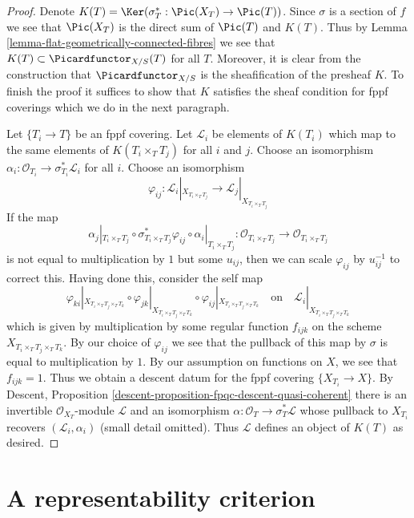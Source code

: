 \begin{proof}
Denote $K(T) = \Ker(\sigma_T^* : \Pic(X_T) \to \Pic(T))$.
Since $\sigma$ is a section of $f$ we see that $\Pic(X_T)$ is the direct
sum of $\Pic(T)$ and $K(T)$.
Thus by Lemma \ref{lemma-flat-geometrically-connected-fibres} we see that
$K(T) \subset \Picardfunctor_{X/S}(T)$ for all $T$. Moreover, it is clear
from the construction that $\Picardfunctor_{X/S}$ is the sheafification
of the presheaf $K$. To finish the proof it suffices to show that
$K$ satisfies the sheaf condition for fppf coverings which we do
in the next paragraph.

\medskip\noindent
Let $\{T_i \to T\}$ be an fppf covering. Let $\mathcal{L}_i$ be
elements of $K(T_i)$ which map to the same elements of $K(T_i \times_T T_j)$
for all $i$ and $j$. Choose an isomorphism
$\alpha_i : \mathcal{O}_{T_i} \to \sigma_{T_i}^*\mathcal{L}_i$
for all $i$. Choose an isomorphism
$$
\varphi_{ij} :
\mathcal{L}_i|_{X_{T_i \times_T T_j}}
\longrightarrow
\mathcal{L}_j|_{X_{T_i \times_T T_j}}
$$
If the map
$$
\alpha_j|_{T_i \times_T T_j} \circ
\sigma_{T_i \times_T T_j}^*\varphi_{ij} \circ
\alpha_i|_{T_i \times_T T_j} :
\mathcal{O}_{T_i \times_T T_j} \to \mathcal{O}_{T_i \times_T T_j}
$$
is not equal to multiplication by $1$ but some $u_{ij}$, then we can scale
$\varphi_{ij}$ by $u_{ij}^{-1}$ to correct this. Having done this, consider
the self map
$$
\varphi_{ki}|_{X_{T_i \times_T T_j \times_T T_k}} \circ
\varphi_{jk}|_{X_{T_i \times_T T_j \times_T T_k}} \circ
\varphi_{ij}|_{X_{T_i \times_T T_j \times_T T_k}}
\quad\text{on}\quad
\mathcal{L}_i|_{X_{T_i \times_T T_j \times_T T_k}}
$$
which is given by multiplication by some regular function $f_{ijk}$
on the scheme $X_{T_i \times_T T_j \times_T T_k}$.
By our choice of $\varphi_{ij}$ we see that the pullback of
this map by $\sigma$ is equal to multiplication by $1$. By
our assumption on functions on $X$, we see that $f_{ijk} = 1$.
Thus we obtain a descent datum for the fppf covering
$\{X_{T_i} \to X\}$. By
Descent, Proposition \ref{descent-proposition-fpqc-descent-quasi-coherent}
there is an invertible $\mathcal{O}_{X_T}$-module $\mathcal{L}$
and an isomorphism $\alpha : \mathcal{O}_T \to \sigma_T^*\mathcal{L}$
whose pullback to $X_{T_i}$ recovers $(\mathcal{L}_i, \alpha_i)$
(small detail omitted). Thus $\mathcal{L}$ defines an object
of $K(T)$ as desired.
\end{proof}



\section{A representability criterion}
\label{section-representability}

